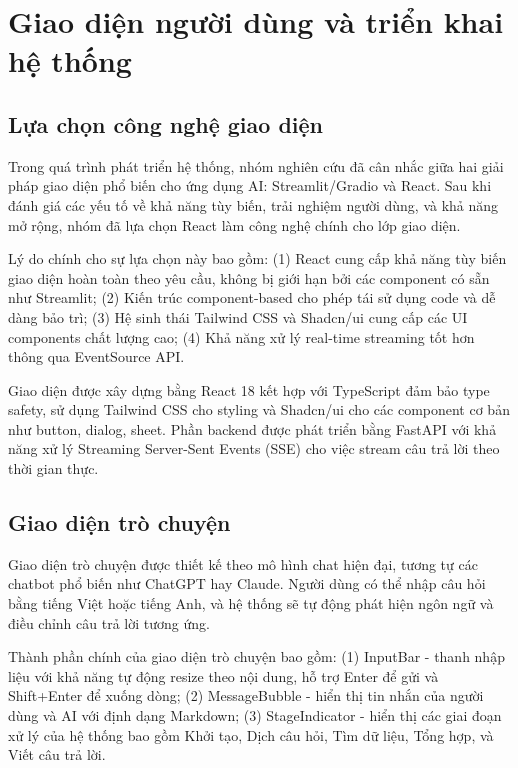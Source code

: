 \section{Giao diện người dùng và triển khai hệ thống}

\subsection{Lựa chọn công nghệ giao diện}

Trong quá trình phát triển hệ thống, nhóm nghiên cứu đã cân nhắc giữa hai giải pháp giao diện phổ biến cho ứng dụng AI: Streamlit/Gradio và React. Sau khi đánh giá các yếu tố về khả năng tùy biến, trải nghiệm người dùng, và khả năng mở rộng, nhóm đã lựa chọn React làm công nghệ chính cho lớp giao diện.

Lý do chính cho sự lựa chọn này bao gồm: (1) React cung cấp khả năng tùy biến giao diện hoàn toàn theo yêu cầu, không bị giới hạn bởi các component có sẵn như Streamlit; (2) Kiến trúc component-based cho phép tái sử dụng code và dễ dàng bảo trì; (3) Hệ sinh thái Tailwind CSS và Shadcn/ui cung cấp các UI components chất lượng cao; (4) Khả năng xử lý real-time streaming tốt hơn thông qua EventSource API.

Giao diện được xây dựng bằng React 18 kết hợp với TypeScript đảm bảo type safety, sử dụng Tailwind CSS cho styling và Shadcn/ui cho các component cơ bản như button, dialog, sheet. Phần backend được phát triển bằng FastAPI với khả năng xử lý Streaming Server-Sent Events (SSE) cho việc stream câu trả lời theo thời gian thực.

\subsection{Giao diện trò chuyện}

Giao diện trò chuyện được thiết kế theo mô hình chat hiện đại, tương tự các chatbot phổ biến như ChatGPT hay Claude. Người dùng có thể nhập câu hỏi bằng tiếng Việt hoặc tiếng Anh, và hệ thống sẽ tự động phát hiện ngôn ngữ và điều chỉnh câu trả lời tương ứng.

Thành phần chính của giao diện trò chuyện bao gồm: (1) InputBar - thanh nhập liệu với khả năng tự động resize theo nội dung, hỗ trợ Enter để gửi và Shift+Enter để xuống dòng; (2) MessageBubble - hiển thị tin nhắn của người dùng và AI với định dạng Markdown; (3) StageIndicator - hiển thị các giai đoạn xử lý của hệ thống bao gồm Khởi tạo, Dịch câu hỏi, Tìm dữ liệu, Tổng hợp, và Viết câu trả lời.

